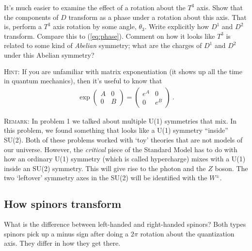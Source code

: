 \documentclass[12pt]{article}
\begin{document}
It's much easier to examine the effect of a rotation about the $T^3$ axis. Show that the components of $D$ transform as a phase under a rotation about this axis. That is, perform a $T^3$ axis rotation by some angle, $\theta_3$. Write explicitly how $D^1$ and $D^2$ transform. Compare this to (\ref{eq:phase}). Comment on how it looks like $T^3$ is related to some kind of \emph{Abelian} symmetry; what are the charges of $D^1$ and $D^2$ under this Abelian symmetry?

\textsc{Hint}: If you are unfamiliar with matrix exponentiation (it shows up all the time in quantum mechanics), then it's useful to know that
\begin{align}
	\exp\begin{pmatrix}
		A & 0 \\
		0 & B
	\end{pmatrix}
	=
	\begin{pmatrix}
		e^A & 0  \\
		0 & e^B
	\end{pmatrix} \ .
\end{align}

\textsc{Remark}: In problem 1 we talked about multiple U(1) symmetries that mix. In this problem, we found something that looks like a U(1) symmetry ``inside'' SU(2). Both of these problems worked with `toy' theories that are not models of our universe. However, the \emph{critical} piece of the Standard Model has to do with how an ordinary U(1) symmetry (which is called hypercharge) mixes with a U(1) inside an SU(2) symmetry. This will give rise to the photon and the $Z$ boson. The two `leftover' symmetry axes in the SU(2) will be identified with the $W^\pm$. 




\subsection{How spinors transform}

What is the difference between left-handed and right-handed spinors? Both types spinors pick up a minus sign after doing a $2\pi$ rotation about the quantization axis. They differ in how they get there. 
\end{document}
